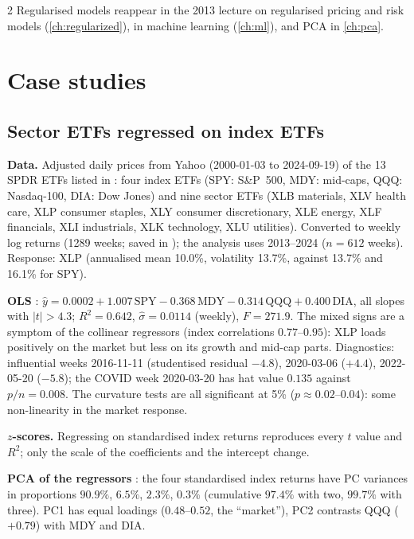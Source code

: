\begin{paracol}{2}
Regularised models reappear in the 2013 lecture on regularised pricing and risk models (\cref{ch:regularized}), in
machine learning (\cref{ch:ml}), and PCA in \cref{ch:pca}.

\section{Case studies}\label{ch05:sec-cases}

\subsection{Sector ETFs regressed on index ETFs}
\begin{casestudy}[ETF case study (\file{lec06_4} = \file{ETF_Casestudy.pdf}, sector XLP)]
\textbf{Data.} Adjusted daily prices from Yahoo (2000-01-03 to 2024-09-19) of the 13 SPDR ETFs listed in
: four index ETFs (SPY: S\&P~500, MDY: mid-caps, QQQ: Nasdaq-100, DIA: Dow Jones) and
nine sector ETFs (XLB materials, XLV health care, XLP consumer staples, XLY consumer discretionary, XLE energy, XLF
financials, XLI industrials, XLK technology, XLU utilities). Converted to weekly log returns (1289 weeks; saved in
); the analysis uses 2013--2024 ($n=612$ weeks). Response: XLP (annualised mean 10.0\%,
volatility 13.7\%, against 13.7\% and 16.1\% for SPY).

\textbf{OLS} : $\hat y=0.0002+1.007\,\text{SPY}-0.368\,\text{MDY}-0.314\,\text{QQQ}+0.400\,\text{DIA}$, all
slopes with $|t|>4.3$; $R^2=0.642$, $\hat\sigma=0.0114$ (weekly), $F=271.9$. The mixed signs are a symptom of the collinear
regressors (index correlations $0.77$--$0.95$): XLP loads positively on the market but less on its growth and mid-cap
parts. Diagnostics: influential weeks 2016-11-11 (studentised residual $-4.8$), 2020-03-06 ($+4.4$), 2022-05-20
($-5.8$); the COVID week 2020-03-20 has hat value $0.135$ against $p/n=0.008$. The curvature tests are all significant
at 5\% ($p\approx0.02$--$0.04$): some non-linearity in the market response.

\textbf{$z$-scores.} Regressing on standardised index returns reproduces every $t$ value and $R^2$; only the scale of the
coefficients and the intercept change.

\textbf{PCA of the regressors} : the four standardised index returns have PC variances in proportions
$90.9\%$, $6.5\%$, $2.3\%$, $0.3\%$ (cumulative $97.4\%$ with two, $99.7\%$ with three). PC1 has equal loadings
($0.48$--$0.52$, the ``market''), PC2 contrasts QQQ ($+0.79$) with MDY and DIA.


\end{casestudy}
\end{paracol}
